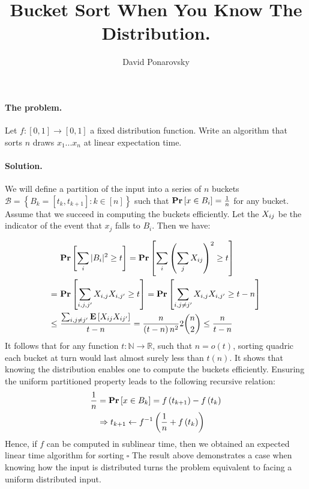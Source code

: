 \documentclass{article}
\begin{document}
\title{Bucket Sort When You Know The Distribution.} 
\author{David Ponarovsky}
\maketitle
{} 

  \paragraph{The problem.} Let $f: [0,1] \rightarrow [0,1]$ a fixed distribution function. Write an algorithm that sorts $n$ draws $x_1 ... x_{n}$ at linear expectation time.  
  \paragraph{Solution.} We will define a partition of the input into a series of $n$ buckets $\mathcal{B} = \left\{ B_{k} = [t_{k}, t_{k+1} ]: k \in [n]  \right\}$ such that $ \mathbf{Pr} \left[ { x \in B_{i}} \right] = \frac{1}{n}$ for any bucket. Assume that we succeed in computing the buckets efficiently. Let the $X_{ij}$ be the indicator of the event that $x_{j}$ falls to $B_i$. Then we have:

  \begin{equation*}
    \begin{split}
      & \ \mathbf{Pr} \left[ {\sum_{i}{|B_{i}|^{2}} \ge t} \right] = \mathbf{Pr} \left[ { \sum_{i}{\left( \sum_{j}X_{ij} \right)^{2}} \ge t   } \right] \\
     = & \ \mathbf{Pr} \left[ { \sum_{i,j,j^{\prime}}{X_{i,j}X_{i,j^{\prime}} } \ge t  } \right] = \mathbf{Pr} \left[ { \sum_{i,j\neq j^{\prime}}{X_{i,j}{X_{i,j^{\prime}} } \ge t - n   } } \right]\\ 
    \le & \ \frac{\sum_{i,j\neq j^{\prime}}{\mathbf{E} \left[ { X_{ij}X_{ij^{\prime}}  } \right]}}{ t - n  } = \frac{n}{\left(t-n \right)n^{2}}2\binom{n}{2}  \le \frac{n}{t-n}  
    \end{split}
  \end{equation*}
  It follows that for any function $t: \mathbb{N} \rightarrow \mathbb{R}$, such that $n = o\left( t \right)$, sorting quadric each bucket at turn would last almost surely less than $t(n)$.  
  It shows that knowing the distribution enables one to compute the buckets efficiently. Ensuring the uniform partitioned property leads to the following recursive relation: 
  \begin{equation*}
    \begin{split}
      \frac{1}{n} &= \mathbf{Pr} \left[ { x \in B_{k} } \right] = f\left( t_{k+1} \right)- f\left( t_{k} \right) \\
      & \Rightarrow t_{k+1} \leftarrow f^{-1}\left( \frac{1}{n} + f\left( t_{k} \right) \right) 
    \end{split}
  \end{equation*} 
  Hence, if $f$ can be computed in sublinear time, then we obtained an expected linear time algorithm for sorting $\square$
  The result above demonstrates a case when knowing how the input is distributed turns the problem equivalent to facing a uniform distributed input.     
\printbibliography 
\end{document}
